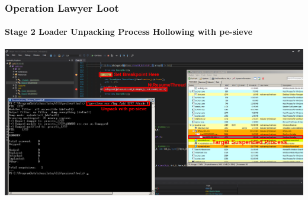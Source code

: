 \documentclass[aspectratio=169]{beamer}
\begin{document}
{
\begin{frame}
  \frametitle{Operation Lawyer Loot}
  \framesubtitle{Stage 2 Loader Unpacking Process Hollowing
    with pe-sieve}
  \begin{center}
    \includegraphics[width=14cm]{kpot-unpacking-11}
  \end{center}
\end{frame}
}
\end{document}
